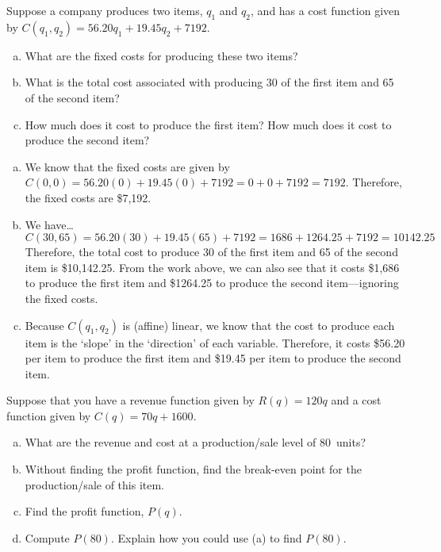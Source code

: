 \documentclass[11pt,letterpaper]{article}
\begin{document}
 Suppose a company produces two items, $q_1$ and $q_2$, and has a cost function given by $C(q_1, q_2)= 56.20q_1 + 19.45q_2 + 7192$. 
	\begin{enumerate}[(a)]
	\item What are the fixed costs for producing these two items?
	\item What is the total cost associated with producing 30 of the first item and 65 of the second item?
	\item How much does it cost to produce the first item? How much does it cost to produce the second item?
	\end{enumerate} \pspace

\sol 
\begin{enumerate}[(a)]
\item We know that the fixed costs are given by $C(0, 0)= 56.20(0) + 19.45(0) + 7192= 0 + 0 + 7192= 7192$. Therefore, the fixed costs are \$7,192. \pspace

\item We have\dots
	\[
	C(30, 65)= 56.20(30) + 19.45(65) + 7192= 1686 + 1264.25 + 7192= 10142.25
	\]
Therefore, the total cost to produce 30 of the first item and 65 of the second item is \$10,142.25. From the work above, we can also see that it costs \$1,686 to produce the first item and \$1264.25 to produce the second item---ignoring the fixed costs. \pspace

\item Because $C(q_1, q_2)$ is (affine) linear, we know that the cost to produce each item is the `slope' in the `direction' of each variable. Therefore, it costs \$56.20 per item to produce the first item and \$19.45 per item to produce the second item. 
\end{enumerate}



\newpage



 Suppose that you have a revenue function given by $R(q)= 120q$ and a cost function given by $C(q)= 70q + 1600$. 
	\begin{enumerate}[(a)]
	\item What are the revenue and cost at a production/sale level of 80~units?
	\item Without finding the profit function, find the break-even point for the production/sale of this item.
	\item Find the profit function, $P(q)$.
	\item Compute $P(80)$. Explain how you could use (a) to find $P(80)$. 
	\end{enumerate} \pspace
\end{document}
